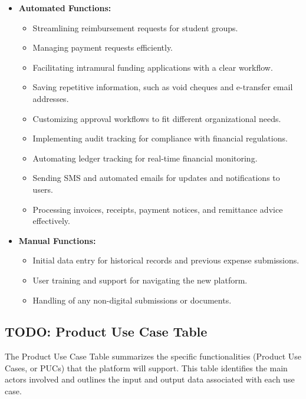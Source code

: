\documentclass[12pt]{article}
\begin{document}
\begin{itemize}
    \item \textbf{Automated Functions:}
    \begin{itemize}
        \item Streamlining reimbursement requests for student groups.
        \item Managing payment requests efficiently.
        \item Facilitating intramural funding applications with a clear workflow.
        \item Saving repetitive information, such as void cheques and e-transfer email addresses.
        \item Customizing approval workflows to fit different organizational needs.
        \item Implementing audit tracking for compliance with financial regulations.
        \item Automating ledger tracking for real-time financial monitoring.
        \item Sending SMS and automated emails for updates and notifications to users.
        \item Processing invoices, receipts, payment notices, and remittance advice effectively.
    \end{itemize}
    \item \textbf{Manual Functions:}
    \begin{itemize}
        \item Initial data entry for historical records and previous expense submissions.
        \item User training and support for navigating the new platform.
        \item Handling of any non-digital submissions or documents.
    \end{itemize}
\end{itemize}

\subsection{TODO: Product Use Case Table}
The Product Use Case Table summarizes the specific functionalities (Product Use Cases, or PUCs) that the platform will support. This table identifies the main actors involved and outlines the input and output data associated with each use case.
\end{document}
